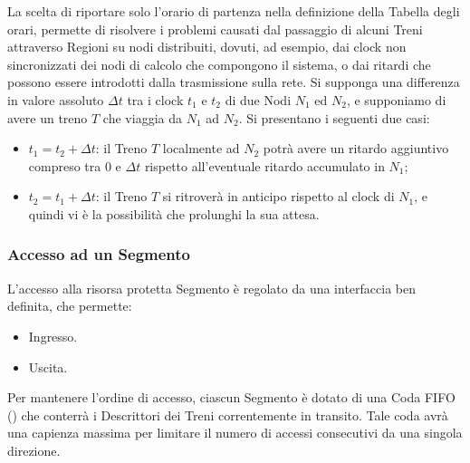 	La scelta di riportare solo l'orario di partenza nella definizione della Tabella degli orari, permette di risolvere i problemi causati dal passaggio di alcuni Treni attraverso Regioni su nodi distribuiti, dovuti, ad esempio, dai clock non sincronizzati dei nodi di calcolo che compongono il sistema, o dai ritardi che possono essere introdotti dalla trasmissione sulla rete. Si supponga una differenza in valore assoluto $\Delta t$ tra i clock $t_1$ e $t_2$ di due Nodi $N_1$ ed $N_2$, e supponiamo di avere un treno $T$ che viaggia da $N_1$ ad $N_2$. Si presentano i seguenti due casi:
	
	\begin{itemize}
		\item $t_1 = t_2+\Delta t$: il Treno $T$ localmente ad $N_2$ potrà avere un ritardo aggiuntivo compreso tra $0$ e $\Delta t$ rispetto all'eventuale ritardo accumulato in $N_1$;
		\item $t_2 = t_1+\Delta t$: il Treno $T$ si ritroverà in anticipo rispetto al clock di $N_1$, e quindi vi è la possibilità che prolunghi la sua attesa.
	\end{itemize}
	
	
	
		\subsubsection{Accesso ad un Segmento}
		
		L'accesso alla risorsa protetta Segmento è regolato da una interfaccia ben definita, che permette:
			\begin{itemize}
				\item Ingresso.
				\item Uscita.
			\end{itemize}
		Per mantenere l'ordine di accesso, ciascun Segmento è dotato di una Coda FIFO () che conterrà i Descrittori dei Treni correntemente in transito. Tale coda avrà una capienza massima per limitare il numero di accessi consecutivi da una singola direzione. 
		
